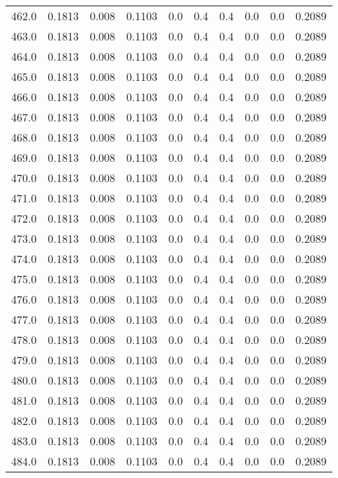 \begin{longtable}{lrrrrrrrrr}
462.0 & 0.1813 & 0.008 & 0.1103 & 0.0 & 0.4 & 0.4 & 0.0 & 0.0 & 0.2089 \\
463.0 & 0.1813 & 0.008 & 0.1103 & 0.0 & 0.4 & 0.4 & 0.0 & 0.0 & 0.2089 \\
464.0 & 0.1813 & 0.008 & 0.1103 & 0.0 & 0.4 & 0.4 & 0.0 & 0.0 & 0.2089 \\
465.0 & 0.1813 & 0.008 & 0.1103 & 0.0 & 0.4 & 0.4 & 0.0 & 0.0 & 0.2089 \\
466.0 & 0.1813 & 0.008 & 0.1103 & 0.0 & 0.4 & 0.4 & 0.0 & 0.0 & 0.2089 \\
467.0 & 0.1813 & 0.008 & 0.1103 & 0.0 & 0.4 & 0.4 & 0.0 & 0.0 & 0.2089 \\
468.0 & 0.1813 & 0.008 & 0.1103 & 0.0 & 0.4 & 0.4 & 0.0 & 0.0 & 0.2089 \\
469.0 & 0.1813 & 0.008 & 0.1103 & 0.0 & 0.4 & 0.4 & 0.0 & 0.0 & 0.2089 \\
470.0 & 0.1813 & 0.008 & 0.1103 & 0.0 & 0.4 & 0.4 & 0.0 & 0.0 & 0.2089 \\
471.0 & 0.1813 & 0.008 & 0.1103 & 0.0 & 0.4 & 0.4 & 0.0 & 0.0 & 0.2089 \\
472.0 & 0.1813 & 0.008 & 0.1103 & 0.0 & 0.4 & 0.4 & 0.0 & 0.0 & 0.2089 \\
473.0 & 0.1813 & 0.008 & 0.1103 & 0.0 & 0.4 & 0.4 & 0.0 & 0.0 & 0.2089 \\
474.0 & 0.1813 & 0.008 & 0.1103 & 0.0 & 0.4 & 0.4 & 0.0 & 0.0 & 0.2089 \\
475.0 & 0.1813 & 0.008 & 0.1103 & 0.0 & 0.4 & 0.4 & 0.0 & 0.0 & 0.2089 \\
476.0 & 0.1813 & 0.008 & 0.1103 & 0.0 & 0.4 & 0.4 & 0.0 & 0.0 & 0.2089 \\
477.0 & 0.1813 & 0.008 & 0.1103 & 0.0 & 0.4 & 0.4 & 0.0 & 0.0 & 0.2089 \\
478.0 & 0.1813 & 0.008 & 0.1103 & 0.0 & 0.4 & 0.4 & 0.0 & 0.0 & 0.2089 \\
479.0 & 0.1813 & 0.008 & 0.1103 & 0.0 & 0.4 & 0.4 & 0.0 & 0.0 & 0.2089 \\
480.0 & 0.1813 & 0.008 & 0.1103 & 0.0 & 0.4 & 0.4 & 0.0 & 0.0 & 0.2089 \\
481.0 & 0.1813 & 0.008 & 0.1103 & 0.0 & 0.4 & 0.4 & 0.0 & 0.0 & 0.2089 \\
482.0 & 0.1813 & 0.008 & 0.1103 & 0.0 & 0.4 & 0.4 & 0.0 & 0.0 & 0.2089 \\
483.0 & 0.1813 & 0.008 & 0.1103 & 0.0 & 0.4 & 0.4 & 0.0 & 0.0 & 0.2089 \\
484.0 & 0.1813 & 0.008 & 0.1103 & 0.0 & 0.4 & 0.4 & 0.0 & 0.0 & 0.2089 \\

\end{longtable}

